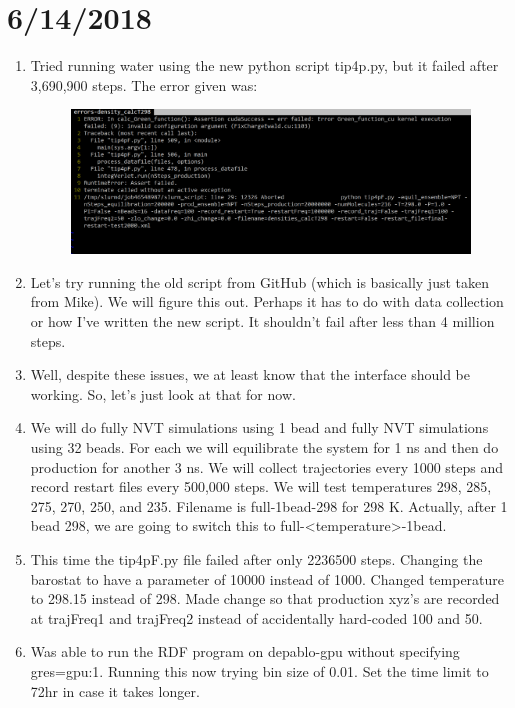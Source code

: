 \documentclass[12pt,reqno]{amsart}
\numberwithin{equation}{section}
\begin{document}
\section{6/14/2018}
\begin{enumerate}
\item Tried running water using the new python script tip4p.py, but it failed after 3,690,900 steps.  The error given was: 
\begin{figure}[H]
\centering
\includegraphics[scale=0.6]{water_error}
\end{figure}
\item Let's try running the old script from GitHub (which is basically just taken from Mike).  We will figure this out.  Perhaps it has to do with data collection or how I've written the new script.  It shouldn't fail after less than 4 million steps.  
\item Well, despite these issues, we at least know that the interface should be working.  So, let's just look at that for now.   
\item We will do fully NVT simulations using 1 bead and fully NVT simulations using 32 beads.  For each we will equilibrate the system for 1 ns and then do production for another 3 ns.  We will collect trajectories every 1000 steps and record restart files every 500,000 steps.  We will test temperatures 298, 285, 275, 270, 250, and 235.    Filename is full-1bead-298 for 298 K.  Actually, after 1 bead 298, we are going to switch this to full-<temperature>-1bead.  
\item This time the tip4pF.py file failed after only 2236500 steps.  Changing the barostat to have a parameter of 10000 instead of 1000.  Changed temperature to 298.15 instead of 298.  Made change so that production xyz's are recorded at trajFreq1 and trajFreq2 instead of accidentally hard-coded 100 and 50.  
\item Was able to run the RDF program on depablo-gpu without specifying gres=gpu:1.  Running this now trying bin size of 0.01.  Set the time limit to 72hr in case it takes longer.  
\end{enumerate}
\end{document}
